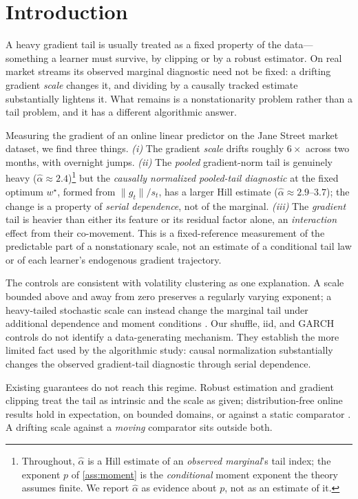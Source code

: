 \documentclass{article}
\newcommand{\norm}[1]{\lVert #1 \rVert}
\newcommand{\gt}{g_t}
\begin{document}
\section{Introduction}
\label{sec:intro}

A heavy gradient tail is usually treated as a fixed property of the data---something a
learner must survive, by clipping or by a robust estimator. On real market streams its observed
marginal diagnostic need not be fixed: a drifting gradient \emph{scale} changes it, and dividing
by a causally tracked estimate substantially lightens it. What remains is a nonstationarity
problem rather than a tail problem, and it has a different algorithmic answer.

Measuring the gradient of an online linear predictor on the Jane Street market dataset, we
find three things. \emph{(i)} The gradient \emph{scale} drifts roughly $6\times$ across two
months, with overnight jumps. \emph{(ii)} The \emph{pooled} gradient-norm tail is genuinely
heavy ($\hat\alpha\approx2.4$)\footnote{Throughout, $\hat\alpha$ is a Hill estimate of an
\emph{observed marginal}'s tail index; the exponent $p$ of \cref{ass:moment} is the
\emph{conditional} moment exponent the theory assumes finite. We report $\hat\alpha$ as
evidence about $p$, not as an estimate of it.} but the \emph{causally normalized pooled-tail
diagnostic} at the fixed optimum $w^\star$, formed from $\norm{\gt}/s_t$, has a larger Hill
estimate ($\hat\alpha\approx2.9$--$3.7$); the change is a property of \emph{serial dependence},
not of the marginal. \emph{(iii)} The \emph{gradient} tail is heavier than either its feature
or its residual factor alone, an \emph{interaction} effect from their co-movement. This is a
fixed-reference measurement of the predictable part of a nonstationary scale, not an estimate
of a conditional tail law or of each learner's endogenous gradient trajectory.

The controls are consistent with volatility clustering as one explanation. A scale bounded
above and away from zero preserves a regularly varying exponent; a heavy-tailed stochastic
scale can instead change the marginal tail under additional dependence and moment conditions
\citep{breiman1965,kesten1973,basrak2002garch}. Our shuffle, iid, and GARCH controls do not
identify a data-generating mechanism. They establish the more limited fact used by the
algorithmic study: causal normalization substantially changes the observed gradient-tail
diagnostic through serial dependence.

Existing guarantees do not reach this regime. Robust estimation and gradient clipping
\citep{catoni2012,devroye2016,lugosi2019,zhang2020clip,gorbunov2020,nguyen2023} treat the tail
as intrinsic and the scale as given; distribution-free online results hold in expectation, on
bounded domains, or against a static comparator \citep{liu2026oco,zhangcutkosky2022}. A
drifting scale against a \emph{moving} comparator sits outside both.
\end{document}
